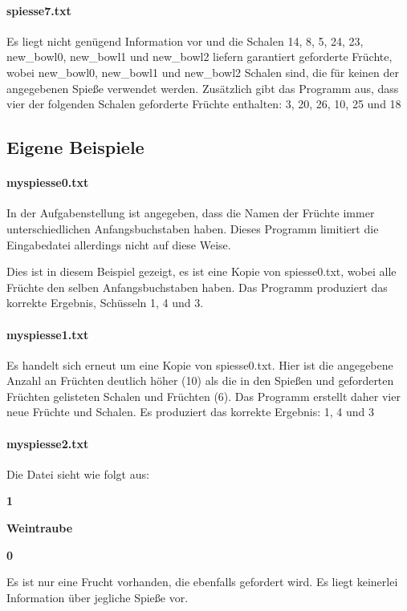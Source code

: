 \documentclass[a4paper,10pt,ngerman]{scrartcl}
\begin{document}
\paragraph{spiesse7.txt}
Es liegt nicht genügend Information vor und die Schalen 14, 8, 5, 24, 23, new\_bowl0, new\_bowl1 und new\_bowl2 liefern garantiert geforderte Früchte, wobei new\_bowl0, new\_bowl1 und new\_bowl2 Schalen sind, die für keinen der angegebenen Spieße verwendet werden.
Zusätzlich gibt das Programm aus, dass vier der folgenden Schalen geforderte Früchte enthalten: 3, 20, 26, 10, 25 und 18

\subsection{Eigene Beispiele}

\paragraph{myspiesse0.txt}
In der Aufgabenstellung ist angegeben, dass die Namen der Früchte immer unterschiedlichen Anfangsbuchstaben haben.
Dieses Programm limitiert die Eingabedatei allerdings nicht auf diese Weise.

Dies ist in diesem Beispiel gezeigt, es ist eine Kopie von spiesse0.txt, wobei alle Früchte den selben Anfangsbuchstaben haben.
Das Programm produziert das korrekte Ergebnis, Schüsseln 1, 4 und 3.

\paragraph{myspiesse1.txt}
Es handelt sich erneut um eine Kopie von spiesse0.txt.
Hier ist die angegebene Anzahl an Früchten deutlich höher (10) als die in den Spießen und geforderten Früchten gelisteten Schalen und Früchten (6).
Das Programm erstellt daher vier neue Früchte und Schalen.
Es produziert das korrekte Ergebnis: 1, 4 und 3

\paragraph{myspiesse2.txt}
Die Datei sieht wie folgt aus:

\textbf{1}

\textbf{Weintraube}

\textbf{0}

Es ist nur eine Frucht vorhanden, die ebenfalls gefordert wird.
Es liegt keinerlei Information über jegliche Spieße vor.
\end{document}
